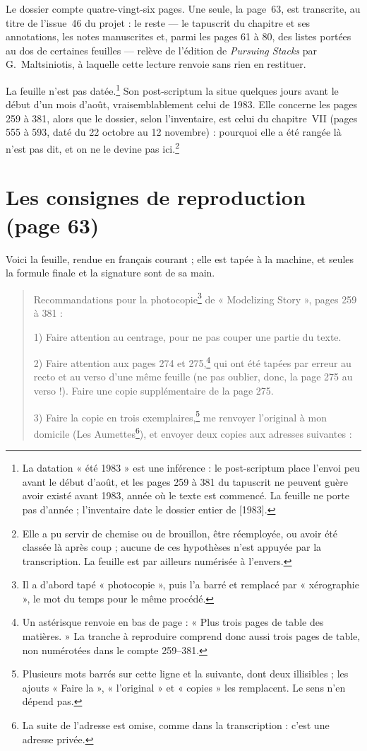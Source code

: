 \documentclass[11pt,a4paper]{article}
\begin{document}
Le dossier compte quatre-vingt-six pages. Une seule, la page~63, est
transcrite, au titre de l'issue~46 du projet : le reste --- le tapuscrit du
chapitre et ses annotations, les notes manuscrites et, parmi les pages 61
à 80, des listes portées au dos de certaines feuilles --- relève de l'édition de \emph{Pursuing Stacks} par
G.~Maltsiniotis, à laquelle cette lecture renvoie sans rien en restituer.

La feuille n'est pas datée.\footnote{La datation « été 1983 » est une
inférence : le post-scriptum place l'envoi peu avant le début d'août, et les
pages 259 à 381 du tapuscrit ne peuvent guère avoir existé avant 1983, année
où le texte est commencé. La feuille ne porte pas d'année ; l'inventaire date
le dossier entier de [1983].} Son post-scriptum la situe quelques jours avant
le début d'un mois d'août, vraisemblablement celui de 1983. Elle concerne les
pages 259 à 381, alors que le dossier, selon l'inventaire, est celui du
chapitre~VII (pages 555 à 593, daté du 22 octobre au 12 novembre) : pourquoi
elle a été rangée là n'est pas dit, et on ne le devine pas
ici.\footnote{Elle a pu servir de chemise ou de brouillon, être réemployée,
ou avoir été classée là après coup ; aucune de ces hypothèses n'est appuyée
par la transcription. La feuille est par ailleurs numérisée à l'envers.}

\section*{Les consignes de reproduction (page 63)}

Voici la feuille, rendue en français courant ; elle est tapée à la machine,
et seules la formule finale et la signature sont de sa main.

\begin{quote}
Recommandations pour la photocopie\footnote{Il a d'abord tapé
« photocopie », puis l'a barré et remplacé par « xérographie », le mot du
temps pour le même procédé.} de « Modelizing Story », pages 259 à 381 :

1) Faire attention au centrage, pour ne pas couper une partie du texte.

2) Faire attention aux pages 274 et 275,\footnote{Un astérisque renvoie en
bas de page : « Plus trois pages de table des matières. » La tranche à
reproduire comprend donc aussi trois pages de table, non numérotées dans le
compte 259--381.} qui ont été tapées par erreur au recto et au verso d'une
même feuille (ne pas oublier, donc, la page 275 au verso !). Faire une copie
supplémentaire de la page 275.

3) Faire la copie en trois exemplaires,\footnote{Plusieurs mots barrés sur
cette ligne et la suivante, dont deux illisibles ; les ajouts « Faire la »,
« l'original » et « copies » les remplacent. Le sens n'en dépend pas.} me
renvoyer l'original à mon domicile (Les Aumettes\footnote{La suite de
l'adresse est omise, comme dans la transcription : c'est une adresse privée.}),
et envoyer deux copies aux adresses suivantes :
\end{quote}
\end{document}
